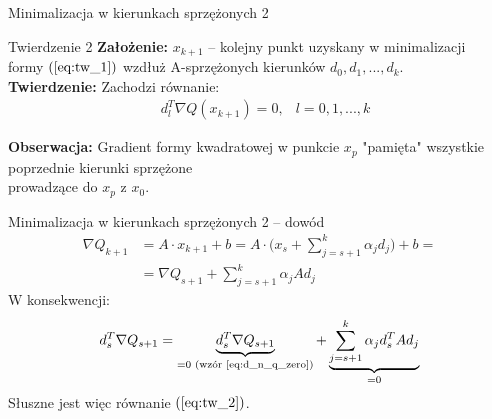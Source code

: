   \begin{frame}{Minimalizacja w kierunkach sprzężonych 2}
    \begin{block}{Twierdzenie 2}
      \textbf{Założenie: } $x_{k + 1}$ -- kolejny punkt uzyskany w minimalizacji\\
      formy $(\ref{eq:tw_1})$ wzdłuż A-sprzężonych kierunków $d_0, d_1, ..., d_k$.\\
      \textbf{Twierdzenie: } Zachodzi równanie:
      \begin{equation}\label{eq:tw_2}
          \begin{aligned}
            &d_l^T \nabla Q(x_{k + 1}) = 0, &l = 0, 1, ..., k
          \end{aligned}
      \end{equation}
    \end{block}

    \begin{block}{}
        \textbf{Obserwacja: } Gradient formy kwadratowej w punkcie $x_p$ "pamięta"
        wszystkie poprzednie kierunki sprzężone\\ prowadzące do $x_p$ z $x_0$.
    \end{block}
  \end{frame}

  \begin{frame}{Minimalizacja w kierunkach sprzężonych 2 -- dowód}
    \begin{equation*}
      \begin{aligned}
        \nabla Q_{k + 1}  &= A \cdot x_{k + 1} + b = A \cdot \bigg(x_s + \sum_{j = s + 1}^k \alpha_j d_j \bigg) + b =\\
                          &= \nabla Q_{s + 1} + \sum_{j = s + 1}^{k} \alpha_j A d_j
      \end{aligned}
    \end{equation*}
    W konsekwencji:
    \begin{equation*}
      \begin{aligned}
        d_s^T \nabla Q_{s + 1} = \underbrace{d_s^T \nabla Q_{s + 1}}_{= 0 \text{ (wzór \ref{eq:d_n_q_zero})}}
        + \underbrace{\sum_{j = s + 1}^k \alpha_j d_s^T A d_j}_{= 0}
      \end{aligned}
    \end{equation*}
    Słuszne jest więc równanie $(\ref{eq:tw_2})$.
  \end{frame}

